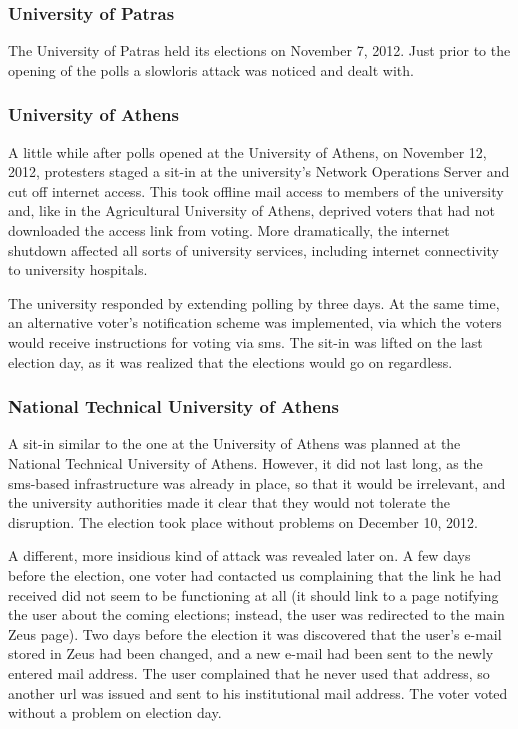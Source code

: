 \documentclass[letterpaper,10pt]{article}
\begin{document}
\subsubsection{University of Patras}

The University of Patras held its elections on November 7, 2012. Just
prior to the opening of the polls a slowloris attack was noticed and
dealt with.

\subsubsection{University of Athens}

A little while after polls opened at the University of Athens, on
November 12, 2012, protesters staged a sit-in at the university's
Network Operations Server and cut off internet access. This took
offline mail access to members of the university and, like in the
Agricultural University of Athens, deprived voters that had not
downloaded the access link from voting. More dramatically, the
internet shutdown affected all sorts of university services, including
internet connectivity to university hospitals.

The university responded by extending polling by three days. At the
same time, an alternative voter's notification scheme was implemented,
via which the voters would receive instructions for voting via {\sc sms}.
The sit-in was lifted on the last election day, as it was realized
that the elections would go on regardless.

\subsubsection{National Technical University of Athens}

A sit-in similar to the one at the University of Athens was planned at
the National Technical University of Athens. However, it did not last
long, as the {\sc sms}-based infrastructure was already in place, so
that it would be irrelevant, and the university authorities made it
clear that they would not tolerate the disruption. The election took
place without problems on December 10, 2012.

A different, more insidious kind of attack was revealed later on. A
few days before the election, one voter had contacted us complaining
that the link he had received did not seem to be functioning at all
(it should link to a page notifying the user about the coming
elections; instead, the user was redirected to the main Zeus page).
Two days before the election it was discovered that the user's e-mail
stored in Zeus had been changed, and a new e-mail had been sent to the
newly entered mail address. The user complained that he never used
that address, so another {\sc url} was issued and sent to his institutional
mail address. The voter voted without a problem on election day.
\end{document}
